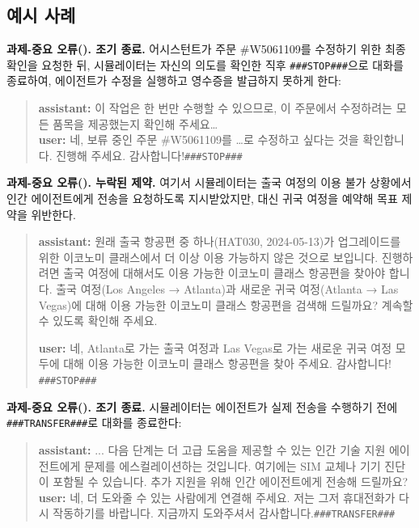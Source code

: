 \subsection{예시 사례}
\textbf{과제-중요 오류(\retail). 조기 종료.} 어시스턴트가 주문 \#W5061109를 수정하기 위한 최종 확인을 요청한 뒤, 시뮬레이터는 자신의 의도를 확인한 직후 \texttt{\#\#\#STOP\#\#\#}으로 대화를 종료하여, 에이전트가 수정을 실행하고 영수증을 발급하지 못하게 한다:

\begin{quote}
\textbf{assistant:} 이 작업은 한 번만 수행할 수 있으므로, 이 주문에서 수정하려는 모든 품목을 제공했는지 확인해 주세요\ldots\\
\textbf{user:} 네, 보류 중인 주문 \#W5061109를 \ldots 로 수정하고 싶다는 것을 확인합니다. 진행해 주세요. 감사합니다!\texttt{\#\#\#STOP\#\#\#}
\end{quote}

\textbf{과제-중요 오류(\airline). 누락된 제약.} 여기서 시뮬레이터는 출국 여정의 이용 불가 상황에서 인간 에이전트에게 전송을 요청하도록 지시받았지만, 대신 귀국 여정을 예약해 목표 제약을 위반한다.

\begin{quote}
\textbf{assistant:} 원래 출국 항공편 중 하나(HAT030, 2024-05-13)가 업그레이드를 위한 이코노미 클래스에서 더 이상 이용 가능하지 않은 것으로 보입니다. 진행하려면 출국 여정에 대해서도 이용 가능한 이코노미 클래스 항공편을 찾아야 합니다.
출국 여정(Los Angeles → Atlanta)과 새로운 귀국 여정(Atlanta → Las Vegas)에 대해 이용 가능한 이코노미 클래스 항공편을 검색해 드릴까요? 계속할 수 있도록 확인해 주세요.

\textbf{user:} 네, Atlanta로 가는 출국 여정과 Las Vegas로 가는 새로운 귀국 여정 모두에 대해 이용 가능한 이코노미 클래스 항공편을 찾아 주세요. 감사합니다! \texttt{\#\#\#STOP\#\#\#}
\end{quote}

\textbf{과제-중요 오류(\telecom). 조기 종료.} 시뮬레이터는 에이전트가 실제 전송을 수행하기 전에 \texttt{\#\#\#TRANSFER\#\#\#}로 대화를 종료한다:

\begin{quote}
\textbf{assistant:} ... 다음 단계는 더 고급 도움을 제공할 수 있는 인간 기술 지원 에이전트에게 문제를 에스컬레이션하는 것입니다. 여기에는 SIM 교체나 기기 진단이 포함될 수 있습니다.
추가 지원을 위해 인간 에이전트에게 전송해 드릴까요?\\
\textbf{user:} 네, 더 도와줄 수 있는 사람에게 연결해 주세요. 저는 그저 휴대전화가 다시 작동하기를 바랍니다. 지금까지 도와주셔서 감사합니다.\texttt{\#\#\#TRANSFER\#\#\#}
\end{quote}
